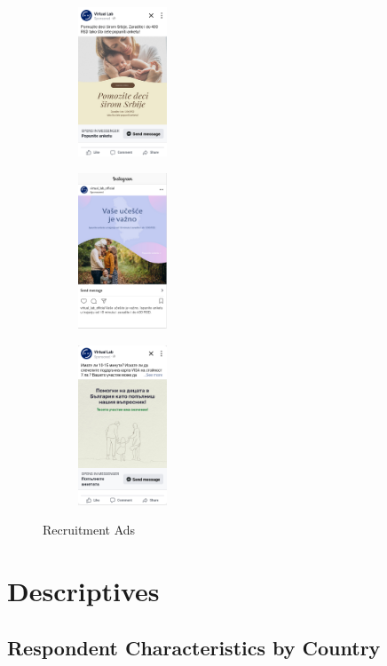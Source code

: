 \documentclass{article}
\begin{document}
\begin{figure}[h]
\centering
\begin{subfigure}{0.3\textwidth}
\centering
\includegraphics[width=100px]{images/recruitment/558.png}
\end{subfigure}
\begin{subfigure}{0.3\textwidth}
\centering
\includegraphics[width=100px]{images/recruitment/639.png}
\end{subfigure}
\begin{subfigure}{0.3\textwidth}
\centering
\includegraphics[width=100px]{images/recruitment/742.png}
\end{subfigure}
\caption{Recruitment Ads}
\label{fig:Recruitment Ads}
\end{figure}


\section{Descriptives}


\subsection*{Respondent Characteristics by Country}
\end{document}
